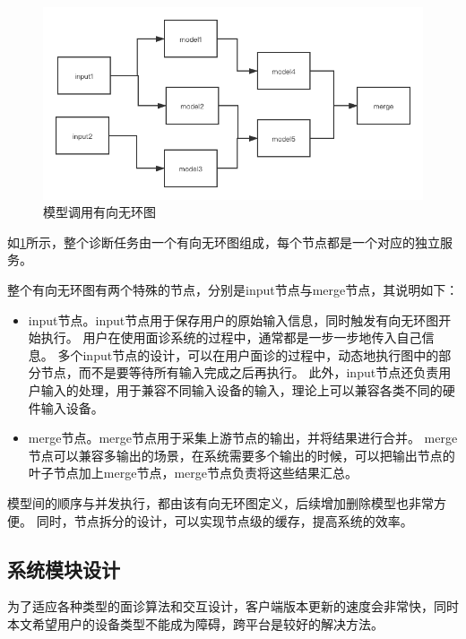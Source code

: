\begin{figure}
    \centering
    \includegraphics[width=15cm]{images/model_dag.png}
    \caption{模型调用有向无环图}
    \label{fig:model_dag}
\end{figure}

如\ref{fig:model_dag}所示，整个诊断任务由一个有向无环图组成，每个节点都是一个对应的独立服务。

整个有向无环图有两个特殊的节点，分别是input节点与merge节点，其说明如下：

\begin{itemize}
    \item input节点。input节点用于保存用户的原始输入信息，同时触发有向无环图开始执行。
    用户在使用面诊系统的过程中，通常都是一步一步地传入自己信息。
    多个input节点的设计，可以在用户面诊的过程中，动态地执行图中的部分节点，而不是要等待所有输入完成之后再执行。
    此外，input节点还负责用户输入的处理，用于兼容不同输入设备的输入，理论上可以兼容各类不同的硬件输入设备。

    \item merge节点。merge节点用于采集上游节点的输出，并将结果进行合并。
    merge节点可以兼容多输出的场景，在系统需要多个输出的时候，可以把输出节点的叶子节点加上merge节点，merge节点负责将这些结果汇总。
\end{itemize}



模型间的顺序与并发执行，都由该有向无环图定义，后续增加删除模型也非常方便。
同时，节点拆分的设计，可以实现节点级的缓存，提高系统的效率。


\subsection{系统模块设计}
为了适应各种类型的面诊算法和交互设计，客户端版本更新的速度会非常快，同时本文希望用户的设备类型不能成为障碍，跨平台是较好的解决方法。


